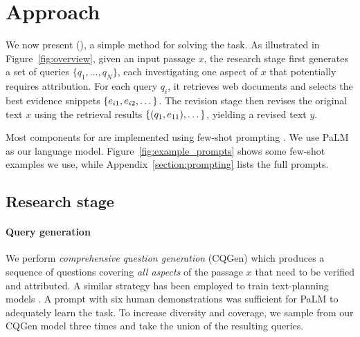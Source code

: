 \section{Approach}\label{section:approach}



We now present \approachfull{} (\approach{}), a simple method for solving the \taskName{} task.
As illustrated in Figure~\ref{fig:overview}, given an input passage $x$,
the research stage first generates a set of queries $\{q_1, ..., q_N\}$, each investigating one aspect of $x$ that potentially requires attribution.
For each query $q_i$, it retrieves web documents and selects the best evidence snippets $\{e_{i1}, e_{i2},\dots\}$.
    The revision stage then revises the original text $x$ using the retrieval results $\{(q_1, e_{11}), \dots\}$, yielding a revised text $y$.

Most components for \approach{} are implemented using few-shot prompting \cite{Brown2020LanguageMA}. We use PaLM \cite{Chowdhery2022PaLMSL} as our language model.
Figure~\ref{fig:example_prompts} shows some few-shot examples we use, while Appendix~\ref{section:prompting} lists the full prompts.





\subsection{Research stage}
\label{section:qgen}


\paragraph{Query generation}
We perform \emph{comprehensive question generation} (CQGen) which produces a sequence of questions covering \emph{all aspects} of the passage $x$ that need to be verified and attributed.
A similar strategy has been employed to train text-planning models \cite{narayan2022blueprint}.
A prompt with six human demonstrations %
was sufficient for PaLM to adequately learn the task.  To increase diversity and coverage, we sample from our CQGen model three times and take the union of the resulting queries.


